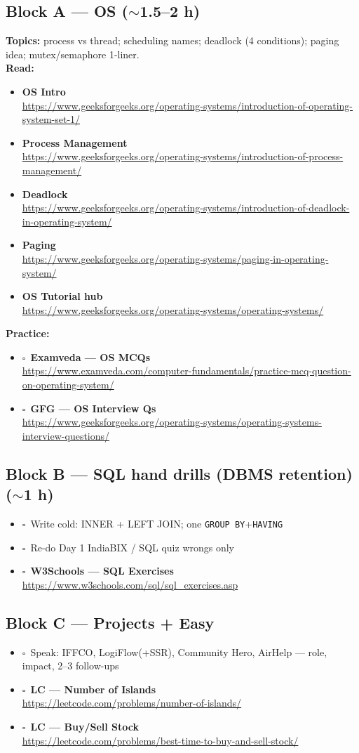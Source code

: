 \documentclass[a4paper,9pt]{extarticle}
\newcommand{\tick}{$\square$\ }
\newcommand{\Res}[2]{\textbf{#1}\\{\footnotesize\url{#2}}}
\begin{document}
\subsection{Block A --- OS ($\sim$1.5--2 h)}
\noindent\textbf{Topics:} process vs thread; scheduling names; deadlock (4 conditions); paging idea; mutex/semaphore 1-liner.\\
\noindent\textbf{Read:}
\begin{itemize}
  \item \Res{OS Intro}{https://www.geeksforgeeks.org/operating-systems/introduction-of-operating-system-set-1/}
  \item \Res{Process Management}{https://www.geeksforgeeks.org/operating-systems/introduction-of-process-management/}
  \item \Res{Deadlock}{https://www.geeksforgeeks.org/operating-systems/introduction-of-deadlock-in-operating-system/}
  \item \Res{Paging}{https://www.geeksforgeeks.org/operating-systems/paging-in-operating-system/}
  \item \Res{OS Tutorial hub}{https://www.geeksforgeeks.org/operating-systems/operating-systems/}
\end{itemize}
\noindent\textbf{Practice:}
\begin{itemize}
  \item \tick \Res{Examveda --- OS MCQs}{https://www.examveda.com/computer-fundamentals/practice-mcq-question-on-operating-system/}
  \item \tick \Res{GFG --- OS Interview Qs}{https://www.geeksforgeeks.org/operating-systems/operating-systems-interview-questions/}
\end{itemize}

\subsection{Block B --- SQL hand drills (DBMS retention) ($\sim$1 h)}
\begin{itemize}
  \item \tick Write cold: INNER + LEFT JOIN; one \texttt{GROUP BY}+\texttt{HAVING}
  \item \tick Re-do Day 1 IndiaBIX / SQL quiz wrongs only
  \item \tick \Res{W3Schools --- SQL Exercises}{https://www.w3schools.com/sql/sql_exercises.asp}
\end{itemize}

\subsection{Block C --- Projects + Easy}
\begin{itemize}
  \item \tick Speak: IFFCO, LogiFlow(+SSR), Community Hero, AirHelp --- role, impact, 2--3 follow-ups
  \item \tick \Res{LC --- Number of Islands}{https://leetcode.com/problems/number-of-islands/}
  \item \tick \Res{LC --- Buy/Sell Stock}{https://leetcode.com/problems/best-time-to-buy-and-sell-stock/}
\end{itemize}
\end{document}
